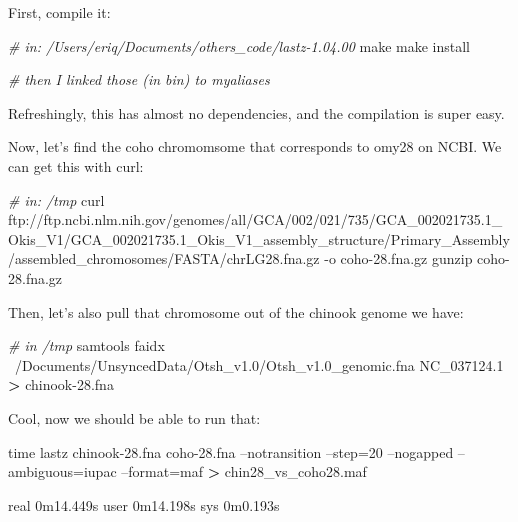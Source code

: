 \documentclass[]{krantz}
\makeatletter
\newenvironment{Shaded}{\begin{snugshade}}{\end{snugshade}}
\newcommand{\BuiltInTok}[1]{#1}
\newcommand{\CommentTok}[1]{\textcolor[rgb]{0.37,0.37,0.37}{\textit{#1}}}
\newcommand{\ExtensionTok}[1]{#1}
\newcommand{\FunctionTok}[1]{\textcolor[rgb]{0,0,0}{#1}}
\newcommand{\NormalTok}[1]{#1}
\newcommand{\OperatorTok}[1]{\textcolor[rgb]{0.43,0.43,0.43}{\textbf{#1}}}
\newenvironment{kframe}{%
\medskip{}
\setlength{\fboxsep}{.8em}
 \def\at@end@of@kframe{}%
 \ifinner\ifhmode%
  \def\at@end@of@kframe{\end{minipage}}%
  \begin{minipage}{\columnwidth}%
 \fi\fi%
 \def\FrameCommand##1{\hskip\@totalleftmargin \hskip-\fboxsep
 \colorbox{shadecolor}{##1}\hskip-\fboxsep
     \hskip-\linewidth \hskip-\@totalleftmargin \hskip\columnwidth}%
 \MakeFramed {\advance\hsize-\width
   \@totalleftmargin\z@ \linewidth\hsize
   \@setminipage}}%
 {\par\unskip\endMakeFramed%
 \at@end@of@kframe}
\renewenvironment{Shaded}{\begin{kframe}}{\end{kframe}}
\makeatother
\begin{document}
First, compile it:

\begin{Shaded}
\begin{Highlighting}[]
\CommentTok{# in: /Users/eriq/Documents/others_code/lastz-1.04.00}
\FunctionTok{make}
\FunctionTok{make}\NormalTok{ install}

\CommentTok{# then I linked those (in bin) to myaliases}
\end{Highlighting}
\end{Shaded}

Refreshingly, this has almost no dependencies, and the compilation is super easy.

Now, let's find the coho chromomsome that corresponds to omy28 on NCBI. We can get this
with curl:

\begin{Shaded}
\begin{Highlighting}[]
\CommentTok{# in: /tmp}
\ExtensionTok{curl}\NormalTok{ ftp://ftp.ncbi.nlm.nih.gov/genomes/all/GCA/002/021/735/GCA_002021735.1_Okis_V1/GCA_002021735.1_Okis_V1_assembly_structure/Primary_Assembly/assembled_chromosomes/FASTA/chrLG28.fna.gz -o coho-28.fna.gz}
\FunctionTok{gunzip}\NormalTok{ coho-28.fna.gz}
\end{Highlighting}
\end{Shaded}

Then, let's also pull that chromosome out of the chinook genome we have:

\begin{Shaded}
\begin{Highlighting}[]
\CommentTok{# in /tmp}
\ExtensionTok{samtools}\NormalTok{ faidx  ~/Documents/UnsyncedData/Otsh_v1.0/Otsh_v1.0_genomic.fna NC_037124.1 }\OperatorTok{>}\NormalTok{ chinook-28.fna }
\end{Highlighting}
\end{Shaded}

Cool, now we should be able to run that:

\begin{Shaded}
\begin{Highlighting}[]
\BuiltInTok{time}\NormalTok{ lastz chinook-28.fna coho-28.fna --notransition --step=20 --nogapped --ambiguous=iupac --format=maf }\OperatorTok{>}\NormalTok{ chin28_vs_coho28.maf}

\ExtensionTok{real}\NormalTok{    0m14.449s}
\ExtensionTok{user}\NormalTok{    0m14.198s}
\ExtensionTok{sys}\NormalTok{ 0m0.193s}
\end{Highlighting}
\end{Shaded}
\end{document}

